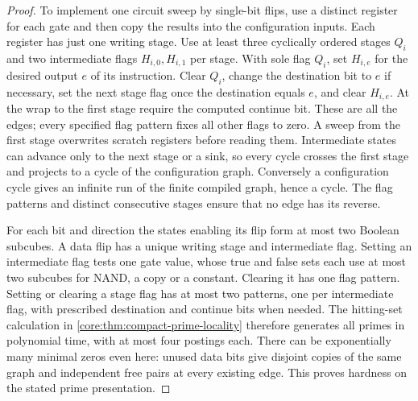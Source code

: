 \begin{proof}
To implement one circuit sweep by single-bit flips, use a distinct
register for each gate and then copy the results into the
configuration inputs. Each register has just one writing stage.
Use at least three cyclically ordered stages $Q_i$ and two
intermediate flags $H_{i,0},H_{i,1}$ per stage. With sole flag
$Q_i$, set $H_{i,e}$ for the desired output $e$ of its instruction.
Clear $Q_i$, change the destination bit to $e$ if necessary, set
the next stage flag once the destination equals $e$, and clear
$H_{i,e}$. At the wrap to the first stage require the computed
continue bit. These are all the edges; every specified flag
pattern fixes all other flags to zero. A sweep from the first
stage overwrites scratch registers before reading them. Intermediate
states can advance only to the next stage or a sink, so every cycle
crosses the first stage and projects to a cycle of the configuration
graph. Conversely a configuration cycle gives an infinite run of
the finite compiled graph, hence a cycle. The flag patterns and
distinct consecutive stages ensure that no edge has its reverse.

For each bit and direction the states enabling its flip form at most
two Boolean subcubes. A data flip has a unique writing stage and
intermediate flag. Setting an intermediate flag tests one gate value,
whose true and false sets each use at most two subcubes for NAND,
a copy or a constant. Clearing it has one flag pattern. Setting or
clearing a stage flag has at most two patterns, one per intermediate
flag, with prescribed destination and continue bits when needed.
The hitting-set calculation in \cref{core:thm:compact-prime-locality}
therefore generates all primes in polynomial time, with at most
four postings each. There can be exponentially many minimal zeros
even here: unused data bits give disjoint copies of the same graph
and independent free pairs at every existing edge. This proves
hardness on the stated prime presentation.
\end{proof}

